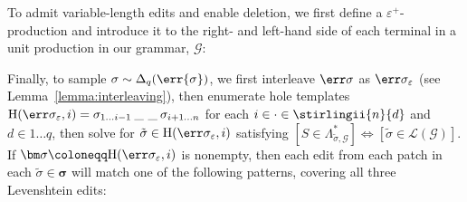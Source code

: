 \documentclass[runningheads]{llncs}
\begin{document}
To admit variable-length edits and enable deletion, we first define a $\varepsilon^+$-production and introduce it to the right- and left-hand side of each terminal in a unit production in our grammar, $\mathcal{G}$:\vspace{5pt}


Finally, to sample $\sigma\sim\Delta_{q}(\err{\sigma})$, we first interleave $\err\sigma$ as $\err\sigma_\varepsilon$ (see Lemma~\ref{lemma:interleaving}), then enumerate hole templates $\text{H}(\err\sigma_\varepsilon, i) = \sigma_{1\ldots i-1}\:\text{\_ \_}\:\sigma_{i+1\ldots n}$ for each $i \in \cdot \in \stirlingii{n}{d}$ and $d \in 1\ldots q$, then solve for $\tilde{\sigma} \in \text{H}(\err\sigma_\varepsilon, i)$ satisfying $[S \in \Lambda^*_{\tilde\sigma, \mathcal{G}}] \Leftrightarrow [\tilde\sigma \in \mathcal{L}(\mathcal{G})]$. If $\bm\sigma \coloneqq \text{H}(\err\sigma_\varepsilon, i)$ is nonempty, then each edit from each patch in each $\tilde{\sigma} \in \bm\sigma$ will match one of the following patterns, covering all three Levenshtein edits:\vspace{-10pt}
\end{document}
